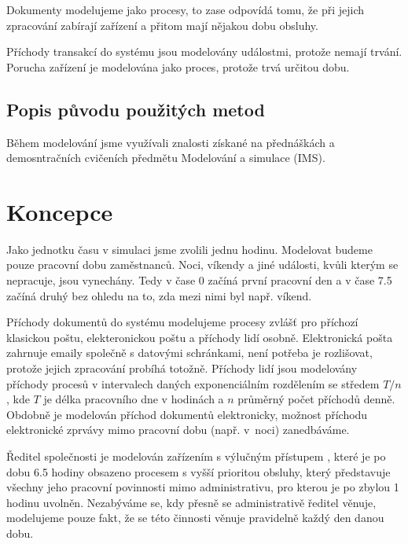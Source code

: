 \documentclass[12pt,a4paper]{article}
\begin{document}
Dokumenty modelujeme jako procesy, to zase odpovídá tomu, že při jejich zpracování zabírají zařízení a přitom mají nějakou dobu obsluhy.

Příchody transakcí do systému jsou modelovány událostmi, protože nemají trvání. Po\-ru\-cha zařízení je modelována jako proces, protože trvá určitou dobu.

\subsection{Popis původu použitých metod}

Během modelování jsme využívali znalosti získané na přednáškách a demosntračních cvičeních předmětu Modelování a simulace (IMS).


\newpage

\section{Koncepce}

Jako jednotku času v simulaci jsme zvolili jednu hodinu.
Modelovat \cite{ims-zakladni-pojmy} budeme pouze pracovní dobu zaměstnanců. Noci, víkendy a jiné události, kvůli kterým se nepracuje, jsou vynechány.
Tedy v čase 0 začíná první pracovní den a v čase 7.5 začíná druhý bez ohledu na to, zda mezi nimi byl např. víkend.

Příchody dokumentů do systému modelujeme procesy zvlášť pro příchozí klasickou poštu, elekteronickou poštu a příchody lidí osobně.
Elektronická pošta zahrnuje emaily společně s datovými schránkami, není potřeba je rozlišovat, protože jejich zpracování probíhá totožně.
Příchody lidí jsou modelovány příchody procesů v intervalech daných exponenciálním rozdělením se středem $T/n$ \cite{ims-rozlozeni}, kde $T$ je délka pracovního dne v ho\-di\-nách a $n$ průměrný počet příchodů denně.
Obdobně je modelován příchod dokumentů elektronicky, možnost příchodu elektronické zprvávy mimo pracovní dobu (např. v~noci) zanedbáváme.

Ředitel společnosti je modelován zařízením s výlučným přístupem \cite{ims-zarizeni}, které je po dobu 6.5 hodiny obsazeno procesem s vyšší prioritou obsluhy,
který představuje všechny jeho pracovní povinnosti mimo administrativu, pro kterou je po zbylou 1 hodinu uvolněn.
Ne\-za\-bý\-vá\-me se, kdy přesně se administrativě ředitel věnuje, modelujeme pouze fakt, že se této činnosti věnuje pravidelně každý den danou dobu.
\end{document}
